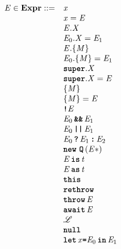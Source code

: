 \documentclass[a4paper,oneside,fleqn]{article}
\newcommand{\synt}[1]{\ensuremath{\text{\textbf{\texttt{#1}}}}}
\DeclareMathOperator{\nnull}{\synt{null}}
\newcommand{\this}{\synt{this}}
\newcommand{\Rethrow}{\synt{rethrow}}
\newcommand{\Throw}[1]{\synt{throw}\,#1}
\newcommand{\dexpr}{\mathbf{Expr}}
\newcommand{\idmeta}{\ensuremath{\mathit{X}}}
\newcommand{\typemeta}{\ensuremath{\mathit{t}}}
\begin{document}
\newcommand{\IsExpression}[2]{#1\,\synt{is}\,#2}
\newcommand{\AsExpression}[2]{#1\,\synt{as}\,#2}




\newcommand{\AwaitExpression}[1]{\synt{await\,#1}}


\newcommand{\StringLiteral}[1]{#1}
\newcommand{\IntLiteral}[1]{#1}
\newcommand{\DoubleLiteral}[1]{#1}
\newcommand{\BoolLiteral}[1]{#1}
\newcommand{\NullLiteral}{\nnull}
\newcommand{\Let}[3]{\synt{let}\,#1\synt{=}#2\,\synt{in}\,#3}


\[
\begin{array}{rl}
  \expressionmeta \in \dexpr ::=
  & \VariableGet{\variablemeta} \\
  & \VariableSet{\variablemeta}{\expressionmeta} \\
  & \PropertyGet{\expressionmeta}{\idmeta} \\
  & \PropertySet{\expressionmeta_0}{\idmeta}{\expressionmeta_1} \\
  & \DirectPropertyGet{\expressionmeta}{\membermeta} \\
  & \DirectPropertySet{\expressionmeta_0}{\membermeta}{\expressionmeta_1} \\
  & \SuperPropertyGet{\idmeta} \\
  & \SuperPropertySet{\idmeta}{\expressionmeta} \\
  & \StaticGet{\membermeta} \\
  & \StaticSet{\membermeta}{\expressionmeta} \\
  & \Not{\expressionmeta} \\
  & \AndExpression{\expressionmeta_0}{\expressionmeta_1} \\
  & \OrExpression{\expressionmeta_0}{\expressionmeta_1} \\
  & \ConditionalExpression{\expressionmeta_0}{\expressionmeta_1}{\expressionmeta_2} \\
  & \New{\synt{Q}}{\expressionmeta*} \\
  & \IsExpression{\expressionmeta}{\typemeta} \\
  & \AsExpression{\expressionmeta}{\typemeta} \\
  & \this \\
  & \Rethrow \\
  & \Throw{\expressionmeta} \\
  & \AwaitExpression{\expressionmeta} \\
  & \lit \\
  & \NullLiteral \\
  & \Let{\variablemeta}{\expressionmeta_0}{\expressionmeta_1} \\
\end{array}
\]
\end{document}
